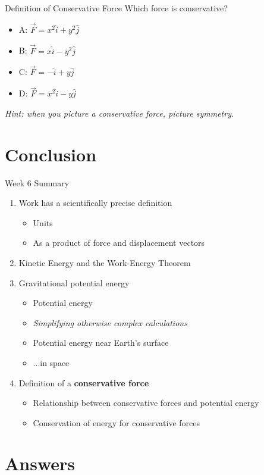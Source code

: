 \documentclass{beamer}
\begin{document}
\begin{frame}{Definition of Conservative Force}
Which force is conservative?
\begin{itemize}
\item A: $\vec{F} = x^2\hat{i}+y^2\hat{j}$
\item B: $\vec{F} = x\hat{i}-y^2\hat{j}$
\item C: $\vec{F} = -\hat{i}+y\hat{j}$
\item D: $\vec{F} = x^2\hat{i}-y\hat{j}$
\end{itemize}
\textit{Hint: when you picture a conservative force, picture symmetry}.
\end{frame}

\section{Conclusion}

\begin{frame}{Week 6 Summary}
\begin{enumerate}
\item \alert{Work} has a scientifically precise definition
\begin{itemize}
\item Units
\item As a product of force and displacement vectors
\end{itemize}
\item Kinetic Energy and the \alert{Work-Energy Theorem}
\item Gravitational potential energy
\begin{itemize}
\item Potential energy
\item \textit{Simplifying otherwise complex calculations}
\item Potential energy near Earth's surface
\item ...in space
\end{itemize}
\item Definition of a \textbf{conservative force}
\begin{itemize}
\item Relationship between conservative forces and potential energy
\item Conservation of energy for conservative forces
\end{itemize}
\end{enumerate}
\end{frame}

\section{Answers}
\end{document}
